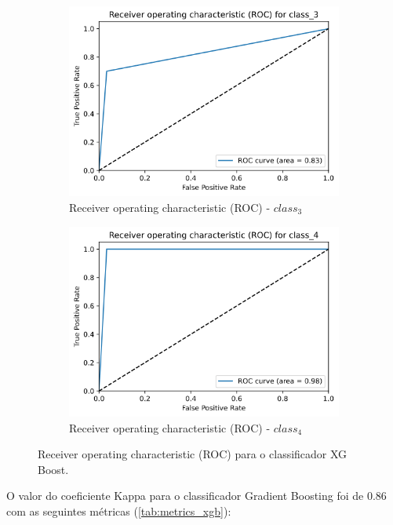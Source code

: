 \documentclass[
	article,			%
	11pt,				%
	oneside,			%
	a4paper,			%
	english,			%
	brazil,				%
	sumario=tradicional
	]{abntex2}
\begin{document}
\begin{figure}
\begin{subfigure}[b]{0.475\textwidth}
    \includegraphics[scale=0.375]{fig/xgb_roc3.png}
    \caption{Receiver operating characteristic (ROC) - $class_3$}
    \label{fig:xgb_roc3}
    \end{subfigure}
    \hfill
    \begin{subfigure}[b]{0.475\textwidth}
    \centering
    \includegraphics[scale=0.375]{fig/xgb_roc4.png}
    \caption{Receiver operating characteristic (ROC) - $class_4$}
    \label{fig:xgb_roc4}
    \end{subfigure}
    \caption{Receiver operating characteristic (ROC) para o classificador XG Boost.}
    \label{xgb_roc}
\end{figure}

O valor do coeficiente Kappa para o classificador Gradient Boosting foi de $0.86$ com as seguintes métricas (\ref{tab:metrics_xgb}):
\end{document}
